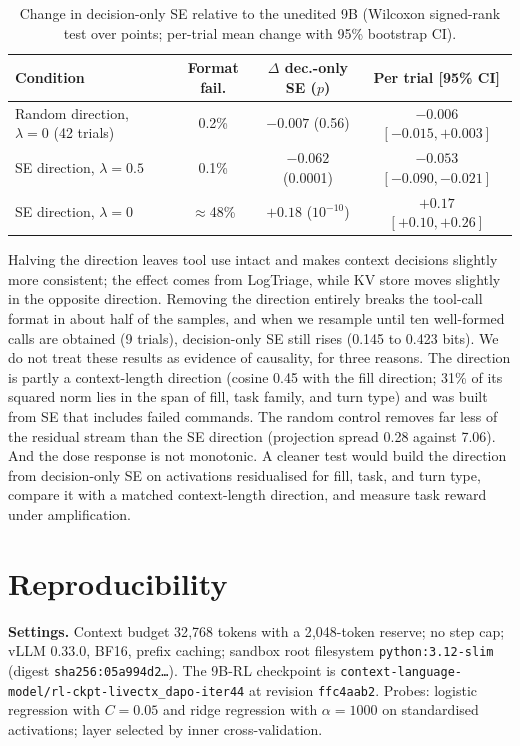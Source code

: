 \documentclass{article}
\begin{document}
\begin{table}[!ht]
  \centering
  \small
  \caption{Change in decision-only SE relative to the unedited 9B (Wilcoxon signed-rank test over points; per-trial mean change with 95\% bootstrap CI).}
  \begin{tabular}{@{}lccc@{}}
    \toprule
    Condition & Format fail. & $\Delta$ dec.-only SE ($p$) & Per trial [95\% CI] \\
    \midrule
    Random direction, $\lambda=0$ (42 trials) & 0.2\% & $-0.007$ (0.56) & $-0.006$ $[-0.015,+0.003]$ \\
    SE direction, $\lambda=0.5$ & 0.1\% & $-0.062$ (0.0001) & $-0.053$ $[-0.090,-0.021]$ \\
    SE direction, $\lambda=0$ & $\approx$48\% & $+0.18$ ($10^{-10}$) & $+0.17$ $[+0.10,+0.26]$ \\
    \bottomrule
  \end{tabular}
\end{table}

Halving the direction leaves tool use intact and makes context decisions slightly more consistent; the effect comes from LogTriage, while KV store moves slightly in the opposite direction.
Removing the direction entirely breaks the tool-call format in about half of the samples, and when we resample until ten well-formed calls are obtained (9 trials), decision-only SE still rises (0.145 to 0.423 bits).
We do not treat these results as evidence of causality, for three reasons.
The direction is partly a context-length direction (cosine 0.45 with the fill direction; 31\% of its squared norm lies in the span of fill, task family, and turn type) and was built from SE that includes failed commands.
The random control removes far less of the residual stream than the SE direction (projection spread 0.28 against 7.06).
And the dose response is not monotonic.
A cleaner test would build the direction from decision-only SE on activations residualised for fill, task, and turn type, compare it with a matched context-length direction, and measure task reward under amplification.

\section{Reproducibility}
\label{app:repro}

\textbf{Settings.} Context budget 32{,}768 tokens with a 2{,}048-token reserve; no step cap; vLLM 0.33.0, BF16, prefix caching; sandbox root filesystem \texttt{python:3.12-slim} (digest \texttt{sha256:05a994d2\ldots}).
The 9B-RL checkpoint is \texttt{context-language-model/rl-ckpt-livectx\_dapo-iter44} at revision \texttt{ffc4aab2}.
Probes: logistic regression with $C=0.05$ and ridge regression with $\alpha=1000$ on standardised activations; layer selected by inner cross-validation.
\end{document}
